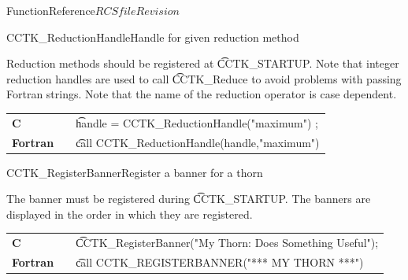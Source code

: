 \begin{cactuspart}{FunctionReference}{$RCSfile$}{$Revision$}
\begin{CCTKFunc}{CCTK\_ReductionHandle}{Handle for given reduction method}
\label{CCTK-ReductionHandle}
\showargs
\begin{params}
\end{params}
\begin{discussion}
Reduction methods should be registered at {\t CCTK\_STARTUP}. Note that
integer reduction handles are used to call {\t CCTK\_Reduce} to avoid
problems with passing Fortran strings. Note that the name of the reduction
operator is case dependent.
\end{discussion}
\begin{examples}
\begin{tabular}{@{}p{3cm}cp{11cm}}
\hfill {\bf C} && {\t handle = CCTK\_ReductionHandle("maximum") };
\\
\hfill {\bf Fortran} && {\t call CCTK\_ReductionHandle(handle,"maximum")}
\\
\end{tabular}
\end{examples}
\begin{errorcodes}
\end{errorcodes}
\end{CCTKFunc}

\begin{CCTKFunc}{CCTK\_RegisterBanner}{Register a banner for a thorn}
\label{CCTK-RegisterBanner}
\showargs
\begin{params}
\end{params}
\begin{discussion}
The banner must be registered during {\t CCTK\_STARTUP}. The banners are
displayed in the order in which they are registered.
\end{discussion}
\begin{examples}
\begin{tabular}{@{}p{3cm}cp{11cm}}
\hfill {\bf C} && {\t CCTK\_RegisterBanner("My Thorn: Does Something Useful")};
\\
\hfill {\bf Fortran} && {\t call CCTK\_REGISTERBANNER("*** MY THORN ***")}
\\
\end{tabular}
\end{examples}
\begin{errorcodes}
\end{errorcodes}
\end{CCTKFunc}


\end{cactuspart}
